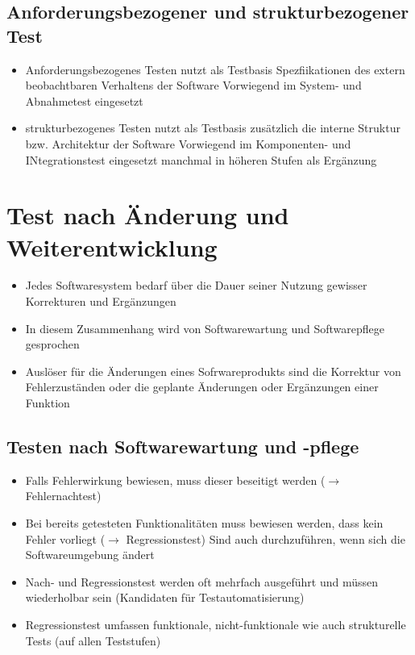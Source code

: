\documentclass{report}
\theoremstyle{definition}
\theoremstyle{example}
\begin{document}
\subsection{Anforderungsbezogener und strukturbezogener Test}
\begin{itemize}
   \item Anforderungsbezogenes Testen nutzt als Testbasis Spezfiikationen des extern beobachtbaren Verhaltens der Software
   \subitem Vorwiegend im System- und Abnahmetest eingesetzt
   \item strukturbezogenes Testen nutzt als Testbasis zusätzlich die interne Struktur bzw. Architektur der Software
   \subitem Vorwiegend im Komponenten- und INtegrationstest eingesetzt
   \subitem manchmal in höheren Stufen als Ergänzung  
\end{itemize}


\section{Test nach Änderung und Weiterentwicklung}
\begin{itemize}
   \item Jedes Softwaresystem bedarf über die Dauer seiner Nutzung gewisser Korrekturen und Ergänzungen
   \item In diesem Zusammenhang wird von Softwarewartung und Softwarepflege gesprochen
   \item Auslöser für die Änderungen eines Sofrwareprodukts sind die Korrektur von Fehlerzuständen oder die geplante Änderungen oder Ergänzungen einer Funktion
\end{itemize}

\subsection{Testen nach Softwarewartung und -pflege}
\begin{itemize}
   \item Falls Fehlerwirkung bewiesen, muss dieser beseitigt werden ($\rightarrow$ Fehlernachtest)
   \item Bei bereits getesteten Funktionalitäten muss bewiesen werden, dass kein Fehler vorliegt ($\rightarrow$ Regressionstest)
   \subitem Sind auch durchzuführen, wenn sich die Softwareumgebung ändert
   \item Nach- und Regressionstest werden oft mehrfach ausgeführt und müssen wiederholbar sein (Kandidaten für Testautomatisierung)
   \item Regressionstest umfassen funktionale, nicht-funktionale wie auch strukturelle Tests (auf allen Teststufen) 
\end{itemize}
\end{document}

